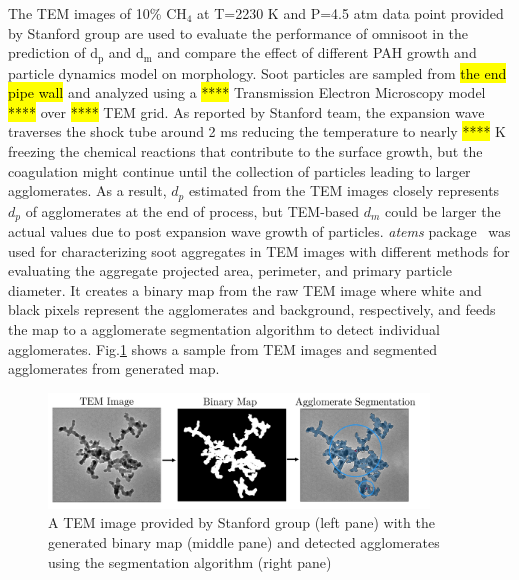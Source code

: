 The TEM images of 10\% $\mathrm{CH_4}$ at T=2230 K and P=4.5 atm data point provided by Stanford group are used to evaluate the performance of omnisoot in the prediction of $\mathrm{d_p}$ and $\mathrm{d_m}$ and compare the effect of different PAH growth and particle dynamics model on morphology. Soot particles are sampled from \hl{the end pipe wall} and analyzed using a \hl{****} Transmission Electron Microscopy model \hl{****} over \hl{****} TEM grid. As reported by Stanford team, the expansion wave traverses the shock tube around 2 ms reducing the temperature to nearly \hl{****} K freezing the chemical reactions that contribute to the surface growth, but the coagulation might continue until the collection of particles leading to larger agglomerates. As a result, $d_p$ estimated from the TEM images closely represents $d_p$ of agglomerates at the end of process, but TEM-based $d_m$ could be larger the actual values due to post expansion wave growth of particles. \textit{atems} package~\citep{sipkens2021using} was used for characterizing soot aggregates in TEM images with different methods for evaluating the aggregate projected area, perimeter, and primary particle diameter. It creates a binary map from the raw TEM image where white and black pixels represent the agglomerates and background, respectively, and feeds the map to a agglomerate segmentation algorithm to detect individual agglomerates. Fig.\ref{fig:shocktubest_binarymapprocess} shows a sample from TEM images and segmented agglomerates from generated map.

\begin{figure}[H]
	\centering
	\includegraphics[width=0.9\textwidth]{Figures/Results/Shocktube/Stanford/TEM/binarymapprocess.pdf}
	\caption{A TEM image provided by Stanford group (left pane) with the generated binary map (middle pane) and detected agglomerates using the segmentation algorithm (right pane)}
	\label{fig:shocktubest_binarymapprocess} 
\end{figure}

